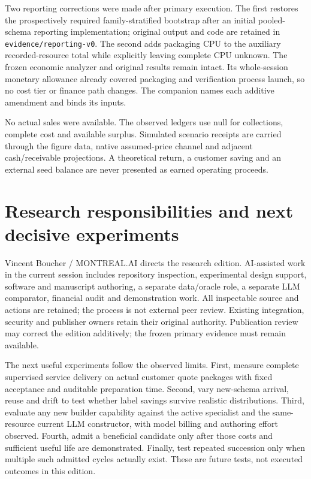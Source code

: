 \documentclass[11pt,letterpaper]{article}
\newcommand{\code}[1]{\texttt{\small #1}}
\begin{document}
Two reporting corrections were made after primary execution. The first restores the prospectively required family-stratified bootstrap after an initial pooled-schema reporting implementation; original output and code are retained in \code{evidence/reporting-v0}. The second adds packaging CPU to the auxiliary recorded-resource total while explicitly leaving complete CPU unknown. The frozen economic analyzer and original results remain intact. Its whole-session monetary allowance already covered packaging and verification process launch, so no cost tier or finance path changes. The companion names each additive amendment and binds its inputs.

No actual sales were available. The observed ledgers use null for collections, complete cost and available surplus. Simulated scenario receipts are carried through the figure data, native assumed-price channel and adjacent cash/receivable projections. A theoretical return, a customer saving and an external seed balance are never presented as earned operating proceeds.

\section{Research responsibilities and next decisive experiments}

Vincent Boucher / MONTREAL.AI directs the research edition. AI-assisted work in the current session includes repository inspection, experimental design support, software and manuscript authoring, a separate data/oracle role, a separate LLM comparator, financial audit and demonstration work. All inspectable source and actions are retained; the process is not external peer review. Existing integration, security and publisher owners retain their original authority. Publication review may correct the edition additively; the frozen primary evidence must remain available.

The next useful experiments follow the observed limits. First, measure complete supervised service delivery on actual customer quote packages with fixed acceptance and auditable preparation time. Second, vary new-schema arrival, reuse and drift to test whether label savings survive realistic distributions. Third, evaluate any new builder capability against the active specialist and the same-resource current LLM constructor, with model billing and authoring effort observed. Fourth, admit a beneficial candidate only after those costs and sufficient useful life are demonstrated. Finally, test repeated succession only when multiple such admitted cycles actually exist. These are future tests, not executed outcomes in this edition.
\end{document}
